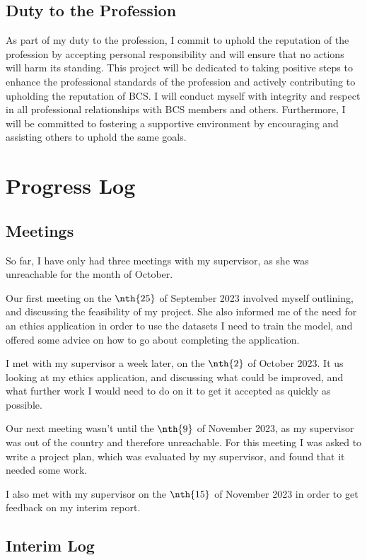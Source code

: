 \documentclass[twocolumn]{report}
\begin{document}
\section{Duty to the Profession}   

As part of my duty to the profession, I commit to uphold the reputation of the profession by accepting personal responsibility and will ensure that no actions will harm its standing. This project will be dedicated to taking positive steps to enhance the professional standards of the profession and actively contributing to upholding the reputation of BCS. I will conduct myself with integrity and respect in all professional relationships with BCS members and others. Furthermore, I will be committed to fostering a supportive environment by encouraging and assisting others to uphold the same goals. 

\chapter{Progress Log}

\section{Meetings}

So far, I have only had three meetings with my supervisor, as she was unreachable for the month of October. 

Our first meeting on the $\nth{25}$ of September 2023 involved myself outlining, and discussing the feasibility of my project. She also informed me of the need for an ethics application in order to use the datasets I need to train the model, and offered some advice on how to go about completing the application. 

I met with my supervisor a week later, on the $\nth{2}$ of October 2023. It us looking at my ethics application, and discussing what could be improved, and what further work I would need to do on it to get it accepted as quickly as possible. 

Our next meeting wasn't until the $\nth{9}$ of November 2023, as my supervisor was out of the country and therefore unreachable. For this meeting I was asked to write a project plan, which was evaluated by my supervisor, and found that it needed some work. 

I also met with my supervisor on the $\nth{15}$ of November 2023 in order to get feedback on my interim report. 

\section{Interim Log}
\end{document}
